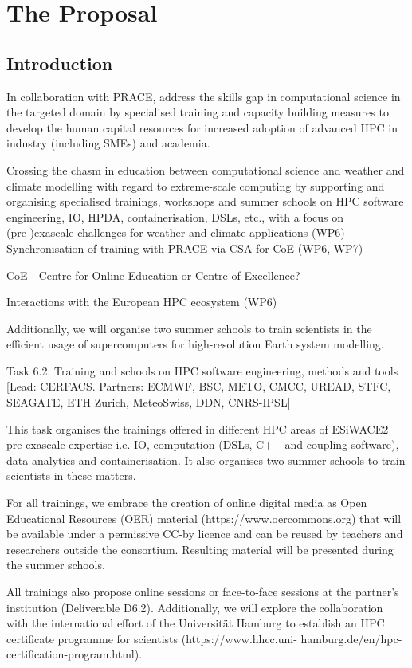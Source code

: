 \chapter{The Proposal}
\label{ch:prop}

\section{Introduction}

In collaboration with PRACE, address the skills gap in computational science in the targeted domain by specialised training and capacity building measures to develop the human capital resources for increased adoption of advanced HPC in industry (including SMEs) and academia.

Crossing the chasm in education between computational science and weather and climate modelling with regard to extreme-scale computing by supporting and organising specialised trainings, workshops and summer schools on HPC software engineering, IO, HPDA, containerisation, DSLs, etc., with a focus on (pre-)exascale challenges for weather and climate applications (WP6) Synchronisation of training with PRACE via CSA for CoE (WP6, WP7)

CoE - Centre for Online Education or Centre of Excellence?

Interactions with the European HPC ecosystem (WP6)

Additionally, we will organise two summer schools to train scientists in the efficient usage of supercomputers for high-resolution Earth system modelling.

Task 6.2: Training and schools on HPC software engineering, methods and tools [Lead: CERFACS. Partners: ECMWF, BSC, METO, CMCC, UREAD, STFC, SEAGATE, ETH Zurich, MeteoSwiss, DDN, CNRS-IPSL]

This task organises the trainings offered in different HPC areas of ESiWACE2 pre-exascale expertise i.e. IO, computation (DSLs, C++ and coupling software), data analytics and containerisation. It also organises two summer schools to train scientists in these matters.

For all trainings, we embrace the creation of online digital media as Open Educational Resources (OER) material (https://www.oercommons.org) that will be available under a permissive CC-by licence and can be reused by teachers and researchers outside the consortium. Resulting material will be presented during the summer schools.

All trainings also propose online sessions or face-to-face sessions at the partner’s institution (Deliverable D6.2). Additionally, we will explore the collaboration with the international effort of the Universität Hamburg to establish an HPC certificate programme for scientists (https://www.hhcc.uni- hamburg.de/en/hpc-certification-program.html).

